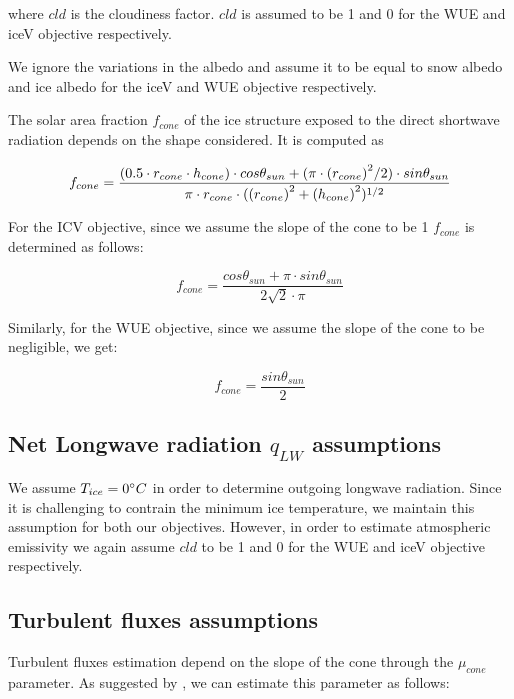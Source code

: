\documentclass[tc, manuscript]{copernicus}
\begin{document}
where $cld$ is the cloudiness factor. $cld$ is assumed to be 1 and 0 for the WUE and iceV objective
respectively.

We ignore the variations in the albedo and assume it to be equal to snow albedo and ice albedo for the iceV and
WUE objective respectively. 

The solar area fraction $f_{cone}$ of the ice structure exposed to the direct shortwave radiation depends on the
shape considered. It is computed as

\begin{equation}
		f_{cone} =\frac{(0.5 \cdot r_{cone} \cdot h_{cone}) \cdot cos \theta_{sun} +(\pi \cdot
			{(r_{cone})}^2/2) \cdot sin \theta_{sun} }{\pi \cdot r_{cone} \cdot ({(r_{cone})}^2+{(h_{cone})}^2)^{1/2}}\\
\end{equation}

For the ICV objective, since we assume the slope of the cone to be 1 $f_{cone}$ is determined
as follows:

\begin{equation}
		f_{cone} =\frac{ cos \theta_{sun} + \pi \cdot sin \theta_{sun} }{2\sqrt{2} \cdot \pi }
\end{equation}

Similarly, for the WUE objective, since we assume the slope of the cone to be negligible, we get:

\begin{equation}
		f_{cone} =\frac{ sin \theta_{sun} }{2 }
\end{equation}

\subsection{Net Longwave radiation \texorpdfstring{$q_{LW}$}{Lg} assumptions} \label{sec:LW}

We assume $T_{ice} = 0 ^{\circ} C$ in order to determine outgoing longwave radiation. Since it is challenging to
contrain the minimum ice temperature, we maintain this assumption for both our objectives. However, in order to
estimate atmospheric emissivity we again assume $cld$ to be 1 and 0 for the WUE and iceV objective respectively.

\subsection{Turbulent fluxes assumptions} \label{sec:Qs}

Turbulent fluxes estimation depend on the slope of the cone through the $\mu_{cone}$ parameter. As suggested 
by \citet{oerlemansBriefCommunicationGrowth2021}, we can estimate this parameter as follows:
\end{document}
